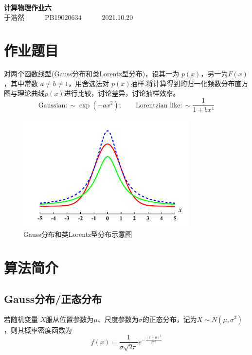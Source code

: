 \documentclass[12pt,a4paper,utf8]{ctexart}
\begin{document}
\begin{center}
    {\LARGE\textbf{计算物理作业六}}\\
    \textrm{于浩然}~~~~~~\textrm{PB19020634}~~~~~~\textrm{2021.10.20}
\end{center}

\section{作业题目}

对两个函数线型(Gauss分布和类Lorentz型分布)，设其一为
$p(x)$，另一为$F(x)$，其中常数 $a \neq b \neq 1$，用舍选法对
$p(x)$抽样.将计算得到的归一化频数分布直方图与理论曲线$p(x)$进行比较，讨论差异，讨论抽样效率。
\begin{equation}
    \textrm{Gaussian}: \sim \exp (-ax^2); \qquad \textrm{Lorentzian like}: \sim
    \frac{1}{1 + bx^4}
\end{equation}

\begin{figure}[htp]
    \centering
    \includegraphics[width=0.8\textwidth]{tit.png}
    \caption{Gauss分布和类Lorentz型分布示意图}
\end{figure}    
\section{算法简介}
\subsection{Gauss分布/正态分布}

若随机变量 $X$服从位置参数为$\mu$、尺度参数为$\sigma$的正态分布，记为$X \sim
N(\mu, \sigma^2)$，则其概率密度函数为
\begin{equation}
    f(x) = \frac{1}{\sigma \sqrt{2\pi}} e^{- \frac{(x - \mu)^2}{2 \sigma ^2}}
\end{equation}
\end{document}
